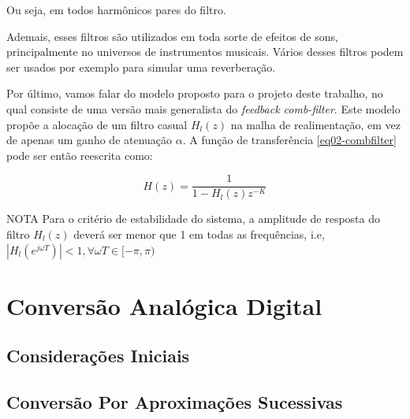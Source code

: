 		Ou seja, em todos harmônicos pares do filtro.
				
		Ademais, esses filtros são utilizados em toda sorte de efeitos de sons, principalmente no universos de instrumentos musicais. Vários desses filtros podem ser usados por exemplo para simular uma reverberação.
		
		Por último, vamos falar do modelo proposto para o projeto deste trabalho, no qual consiste de uma versão mais generalista do \textit{feedback comb-filter}. Este modelo propõe a alocação de um filtro casual $H_l(z)$ na malha de realimentação, em vez de apenas um ganho de atenuação $\alpha$. A função de transferência \ref{eq02-combfilter} pode ser então reescrita como:
		
		\begin{equation}
			H(z) = \frac{1}{1-H_l(z)z^{-K}}
		\end{equation}
		
		\begin{mymdframed}{NOTA}
			Para o critério de estabilidade do sistema, a amplitude de resposta do filtro $ H_l(z) $ deverá ser menor que 1 em todas as frequências, i.e, $ |H_l(e^{j\omega T})| < 1, \forall \omega T \in [-\pi,\pi)$
		\end{mymdframed}
		
		
\section{Conversão Analógica Digital}
	
	\subsection{Considerações Iniciais}
		
	\subsection{Conversão Por Aproximações Sucessivas}
		
